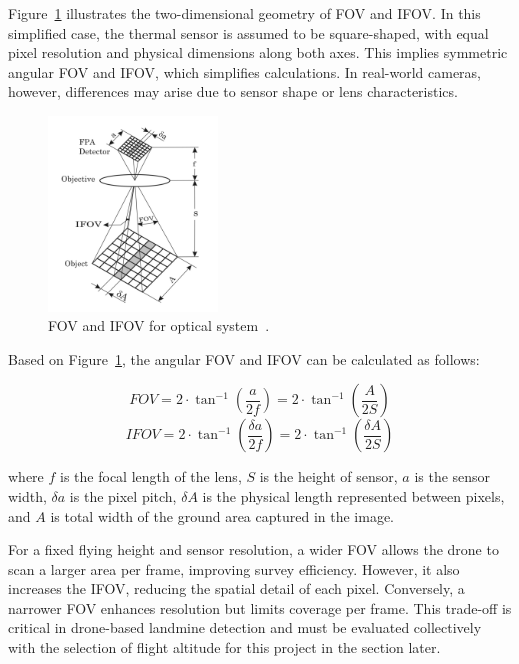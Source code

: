 Figure~\ref{fig:fov_ifov} illustrates the two-dimensional geometry of \gls{FOV} and \gls{IFOV}. In this simplified case, the thermal sensor is assumed to be square-shaped, with equal pixel resolution and physical dimensions along both axes. This implies symmetric angular \gls{FOV} and \gls{IFOV}, which simplifies calculations. In real-world cameras, however, differences may arise due to sensor shape or lens characteristics.

\begin{figure}[H]
    \centering
    \includegraphics[width=0.4\textwidth]{figs/Huirui/fov_ifov_2d_diagram.png}
    \caption[Optical system FOV and IFOV]{FOV and IFOV for optical system~\cite{pencheva2006design}.}
    \label{fig:fov_ifov}
\end{figure}

Based on Figure~\ref{fig:fov_ifov}, the angular \gls{FOV} and \gls{IFOV} can be calculated as follows:

\begin{equation}
    FOV = 2 \cdot \tan^{-1} \left( \frac{a}{2f} \right) = 2 \cdot \tan^{-1} \left( \frac{A}{2S} \right)
    \label{eq:fov}
\end{equation}
\vspace{-1em}
\begin{equation}
    IFOV = 2 \cdot \tan^{-1} \left( \frac{\delta a}{2f} \right) = 2 \cdot \tan^{-1} \left( \frac{\delta A}{2S} \right)
\end{equation}

where \( f \) is the focal length of the lens, \( S \) is the height of sensor, \( a \) is the sensor width, \( \delta a \) is the pixel pitch, \( \delta A \) is the physical length represented between pixels, and \( A \) is total width of the ground area captured in the image.

For a fixed flying height and sensor resolution, a wider \gls{FOV} allows the drone to scan a larger area per frame, improving survey efficiency. However, it also increases the \gls{IFOV}, reducing the spatial detail of each pixel. Conversely, a narrower \gls{FOV} enhances resolution but limits coverage per frame. This trade-off is critical in drone-based landmine detection and must be evaluated collectively with the selection of flight altitude for this project in the section later.


